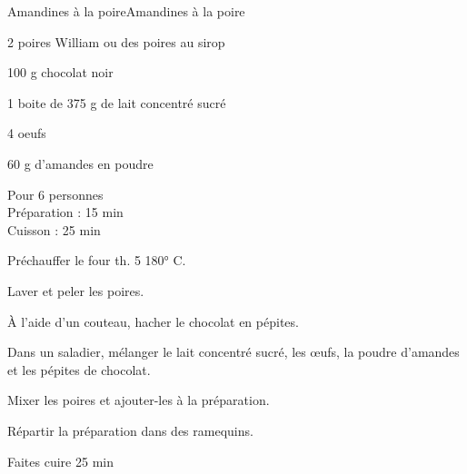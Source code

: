 \begin{recette}{Amandines à la poire}{Amandines à la poire}

\begin{ingredients}
2 poires William ou des poires au sirop \par
100 g chocolat noir \par
1 boite de 375 g de lait concentré sucré\par
4 oeufs\par
60 g d’amandes en poudre \par
\end{ingredients}

\begin{infos}
Pour 6 personnes\\
Préparation : 15 min\\
Cuisson : 25 min\\
\end{infos}

\begin{etapes}
\item Préchauffer le four th. 5 180° C.
\item Laver et peler les poires.
\item À l’aide d’un couteau, hacher le chocolat en pépites.
\item Dans un saladier, mélanger le lait concentré sucré, les œufs, la poudre d’amandes et les pépites de chocolat.
\item Mixer les poires et ajouter-les à la préparation.
\item Répartir la préparation dans des ramequins.
\item Faites cuire 25 min
\end{etapes}

\begin{conseils}
\end{conseils}

\end{recette}